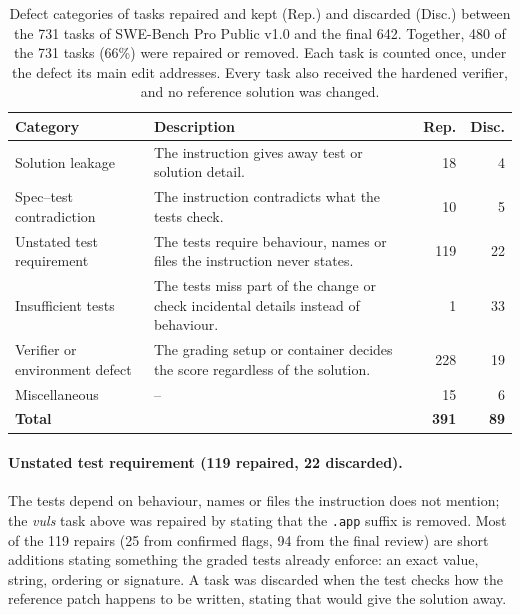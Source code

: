 \begin{table}[t]
\centering
\small
\setlength{\tabcolsep}{3pt}
\begin{tabularx}{\columnwidth}{@{}>{\raggedright\arraybackslash}p{2.05cm} >{\raggedright\arraybackslash}X r r@{}}
\toprule
\textbf{Category} & \textbf{Description} & \textbf{Rep.} & \textbf{Disc.} \\
\midrule
Solution leakage & The instruction gives away test or solution detail. & 18 & 4 \\
\addlinespace
Spec--test contradiction & The instruction contradicts what the tests check. & 10 & 5 \\
\addlinespace
Unstated test requirement & The tests require behaviour, names or files the instruction never states. & 119 & 22 \\
\addlinespace
Insufficient tests & The tests miss part of the change or check incidental details instead of behaviour. & 1 & 33 \\
\addlinespace
Verifier or environment defect & The grading setup or container decides the score regardless of the solution. & 228 & 19 \\
\addlinespace
Miscellaneous & -- & 15 & 6 \\
\midrule
\textbf{Total} & & \textbf{391} & \textbf{89} \\
\bottomrule
\end{tabularx}
\caption{Defect categories of tasks repaired and kept (Rep.) and discarded (Disc.) between the 731 tasks of SWE-Bench Pro Public v1.0 and the final 642. Together, 480 of the 731 tasks (66\%) were repaired or removed. Each task is counted once, under the defect its main edit addresses. Every task also received the hardened verifier, and no reference solution was changed.}
\label{tab:repairs-discards}
\end{table}

\paragraph{Unstated test requirement (119 repaired, 22 discarded).}
The tests depend on behaviour, names or files the instruction does not mention; the \textit{vuls} task above was repaired by stating that the \texttt{.app} suffix is removed. Most of the 119 repairs (25 from confirmed flags, 94 from the final review) are short additions stating something the graded tests already enforce: an exact value, string, ordering or signature. A task was discarded when the test checks how the reference patch happens to be written, stating that would give the solution away.

